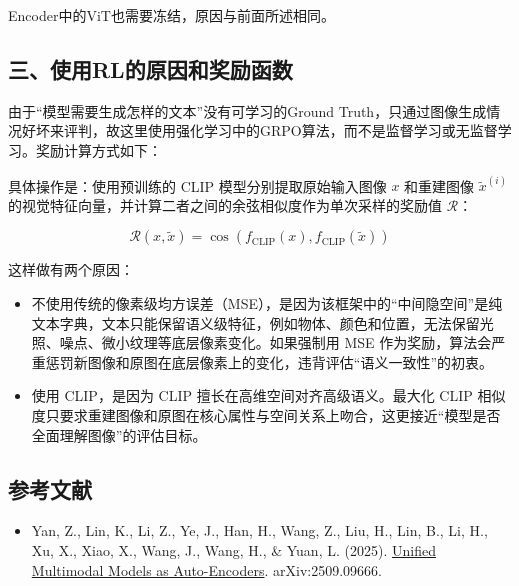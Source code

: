 Encoder中的ViT也需要冻结，原因与前面所述相同。

\hypertarget{ux4e09ux4f7fux7528rlux7684ux539fux56e0ux548cux5956ux52b1ux51fdux6570}{%
\subsection{三、使用RL的原因和奖励函数}\label{ux4e09ux4f7fux7528rlux7684ux539fux56e0ux548cux5956ux52b1ux51fdux6570}}

由于``模型需要生成怎样的文本''没有可学习的Ground Truth，只通过图像生成情况好坏来评判，故这里使用强化学习中的GRPO算法，而不是监督学习或无监督学习。奖励计算方式如下：

具体操作是：使用预训练的 CLIP 模型分别提取原始输入图像 \(x\) 和重建图像 \(\tilde{x}^{(i)}\) 的视觉特征向量，并计算二者之间的余弦相似度作为单次采样的奖励值 \(\mathcal{R}\)：

\[
\mathcal{R}(x, \tilde{x}) = \cos\left(f_{\mathrm{CLIP}}(x), f_{\mathrm{CLIP}}(\tilde{x})\right)
\]

这样做有两个原因：

\begin{itemize}
\tightlist
\item
  不使用传统的像素级均方误差（MSE），是因为该框架中的``中间隐空间''是纯文本字典，文本只能保留语义级特征，例如物体、颜色和位置，无法保留光照、噪点、微小纹理等底层像素变化。如果强制用 MSE 作为奖励，算法会严重惩罚新图像和原图在底层像素上的变化，违背评估``语义一致性''的初衷。
\item
  使用 CLIP，是因为 CLIP 擅长在高维空间对齐高级语义。最大化 CLIP 相似度只要求重建图像和原图在核心属性与空间关系上吻合，这更接近``模型是否全面理解图像''的评估目标。
\end{itemize}

\hypertarget{ux53c2ux8003ux6587ux732e-197}{%
\subsection{参考文献}\label{ux53c2ux8003ux6587ux732e-197}}

\begin{itemize}
\tightlist
\item
  Yan, Z., Lin, K., Li, Z., Ye, J., Han, H., Wang, Z., Liu, H., Lin, B., Li, H., Xu, X., Xiao, X., Wang, J., Wang, H., \& Yuan, L. (2025). \href{https://arxiv.org/abs/2509.09666}{Unified Multimodal Models as Auto-Encoders}. arXiv:2509.09666.
\end{itemize}

\clearpage


